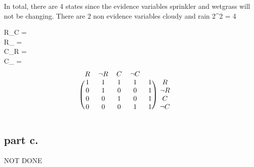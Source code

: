   In total, there are 4 states since the evidence variables sprinkler and wetgrass will not be changing.
  There are 2 non evidence variables cloudy and rain 2^2 = 4 

\noindent
R\_C       =  \\
R\_ =  \\
C\_R       =  \\
C\_ =   \\

  \[
\begin{blockarray}{cccccc}
R & \neg{R} & C & \neg{C} \\
\begin{block}{(ccccc)c}
  1 & 1 & 1 & 1 & 1 & R \\
  0 & 1 & 0 & 0 & 1 & \neg{R} \\
  0 & 0 & 1 & 0 & 1 & C \\
  0 & 0 & 0 & 1 & 1 & \neg{C} \\
\end{block}
\end{blockarray}
 \]

\subsection{part c.}

  NOT DONE
